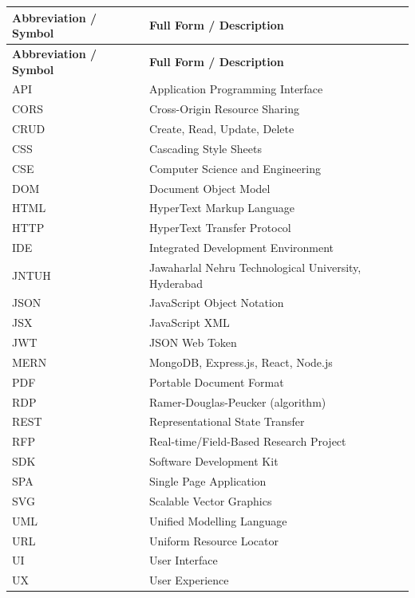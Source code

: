 \documentclass[12pt,a4paper]{report}
\begin{document}
\begin{longtable}{@{} >{\raggedright}p{4cm} p{9cm} @{}}
  \toprule
  \textbf{Abbreviation / Symbol} & \textbf{Full Form / Description} \\
  \midrule
  \endfirsthead

  \toprule
  \textbf{Abbreviation / Symbol} & \textbf{Full Form / Description} \\
  \midrule
  \endhead

  \bottomrule
  \endfoot

  API   & Application Programming Interface \\
  CORS  & Cross-Origin Resource Sharing \\
  CRUD  & Create, Read, Update, Delete \\
  CSS   & Cascading Style Sheets \\
  CSE   & Computer Science and Engineering \\
  DOM   & Document Object Model \\
  HTML  & HyperText Markup Language \\
  HTTP  & HyperText Transfer Protocol \\
  IDE   & Integrated Development Environment \\
  JNTUH & Jawaharlal Nehru Technological University, Hyderabad \\
  JSON  & JavaScript Object Notation \\
  JSX   & JavaScript XML \\
  JWT   & JSON Web Token \\
  MERN  & MongoDB, Express.js, React, Node.js \\
  PDF   & Portable Document Format \\
  RDP   & Ramer-Douglas-Peucker (algorithm) \\
  REST  & Representational State Transfer \\
  RFP   & Real-time/Field-Based Research Project \\
  SDK   & Software Development Kit \\
  SPA   & Single Page Application \\
  SVG   & Scalable Vector Graphics \\
  UML   & Unified Modelling Language \\
  URL   & Uniform Resource Locator \\
  UI    & User Interface \\
  UX    & User Experience \\
  \bottomrule
\end{longtable}
\end{document}
